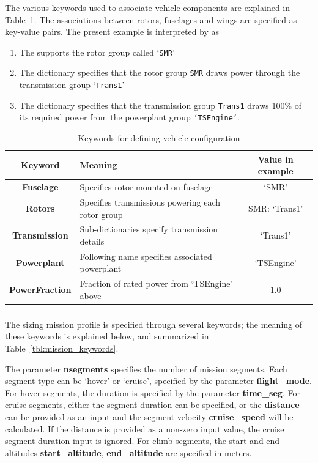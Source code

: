 The various keywords used to associate vehicle components are explained in Table~\ref{tbl:config_smr}. The associations between rotors, fuselages and wings are specified as key-value pairs. The present example is interpreted by \hydra \spc as
\begin{enumerate}
\item The  supports the rotor group called `\texttt{SMR}' 
\item The  dictionary specifies that the rotor group \texttt{SMR} draws power through the transmission group `\texttt{Trans1}'
\item The  dictionary specifies that the transmission group \texttt{Trans1} draws 100\% of its required power from the powerplant group \texttt{`TSEngine'}.
\end{enumerate}
  \begin{table}[H]
\begin{center}
	\caption{Keywords for defining vehicle configuration}
	\label{tbl:config_smr}
    \begin{tabular}{| c | l | c |}
    \hline
    Keyword & Meaning & Value in example \\ 
    \hline
\textbf{Fuselage} & Specifies rotor mounted on fuselage & `SMR' \\
\textbf{Rotors} & Specifies transmissions powering each rotor group & SMR: `Trans1' \\
\textbf{Transmission} & Sub-dictionaries specify transmission details & `Trans1' \\
\textbf{Powerplant} & Following name specifies associated powerplant & `TSEngine' \\
\textbf{PowerFraction} & Fraction of rated power from `TSEngine' above & 1.0 \\
    \hline
  \end{tabular}
\end{center}
\end{table}
\vspace{-1cm}
\subsubsection{}
The sizing mission profile is specified through several keywords; the meaning of these keywords is explained below, and summarized in Table~\ref{tbl:mission_keywords}. 

The parameter \textbf{nsegments} specifies the number of mission segments. Each segment type can be `hover' or `cruise', specified by the parameter \textbf{flight\_mode}. For hover segments, the duration is specified by the parameter \textbf{time\_seg}. For cruise segments, either the segment duration can be specified, or the \textbf{distance} can be provided as an input and the segment velocity \textbf{cruise\_speed} will be calculated. If the distance is provided as a non-zero input value, the cruise segment duration input is ignored. For climb segments, the start and end altitudes \textbf{start\_altitude}, \textbf{end\_altitude} are specified in meters. 


